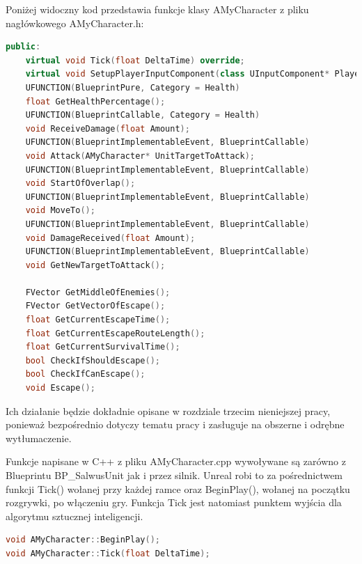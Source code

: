 \documentclass[12pt]{report}
\begin{document}
Poniżej widoczny kod przedstawia funkcje klasy AMyCharacter z pliku nagłówkowego AMyCharacter.h: 
\begin{lstlisting}[language=C++, backgroundcolor=\color{black!5}, basicstyle=\footnotesize, caption= Funkcje klasy AMyCharacter z pliku nagłówkowego AMyCharacter.h]
public:
	virtual void Tick(float DeltaTime) override;
	virtual void SetupPlayerInputComponent(class UInputComponent* PlayerInputComponent) override;
	UFUNCTION(BlueprintPure, Category = Health)
	float GetHealthPercentage();
	UFUNCTION(BlueprintCallable, Category = Health)
	void ReceiveDamage(float Amount);
	UFUNCTION(BlueprintImplementableEvent, BlueprintCallable)
	void Attack(AMyCharacter* UnitTargetToAttack);
	UFUNCTION(BlueprintImplementableEvent, BlueprintCallable)
	void StartOfOverlap();
	UFUNCTION(BlueprintImplementableEvent, BlueprintCallable)
	void MoveTo();
	UFUNCTION(BlueprintImplementableEvent, BlueprintCallable)
	void DamageReceived(float Amount);
	UFUNCTION(BlueprintImplementableEvent, BlueprintCallable)
	void GetNewTargetToAttack();

	FVector GetMiddleOfEnemies();
	FVector GetVectorOfEscape();
	float GetCurrentEscapeTime();
	float GetCurrentEscapeRouteLength();
	float GetCurrentSurvivalTime();
	bool CheckIfShouldEscape();
	bool CheckIfCanEscape();
	void Escape();
\end{lstlisting}
Ich działanie będzie dokładnie opisane w rozdziale trzecim nieniejszej pracy, ponieważ bezpośrednio dotyczy tematu pracy i zasługuje na obszerne i odrębne wytłumaczenie.

Funkcje napisane w C++ z pliku AMyCharacter.cpp wywoływane są zarówno z Blueprintu BP\_SalwusUnit jak i przez silnik. Unreal robi to za pośrednictwem funkcji Tick() wołanej przy każdej ramce oraz BeginPlay(), wołanej na początku rozgrywki, po włączeniu gry. Funkcja Tick jest natomiast punktem wyjścia dla algorytmu sztucznej inteligencji. 
\begin{lstlisting}[language=C++, backgroundcolor=\color{black!5}, basicstyle=\footnotesize, caption= Funkcje wołane przez silnik w pliku AMyCharacter.h]
void AMyCharacter::BeginPlay();
void AMyCharacter::Tick(float DeltaTime);
\end{lstlisting}
\end{document}
